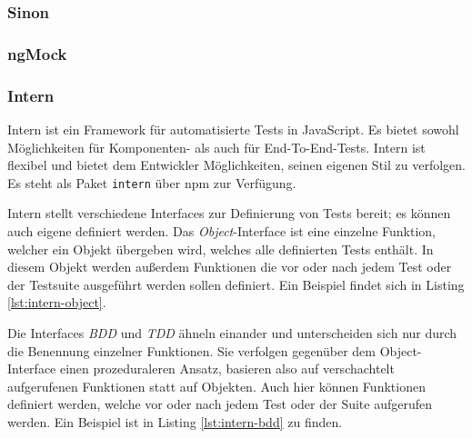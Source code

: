 \begin{figure}[H]
	
\end{figure}


\subsubsection{Sinon}
\label{sec:Sinon}

\subsubsection{ngMock}
\label{sec:ngMock}

\subsubsection{Intern}
\label{sec:Intern}
Intern ist ein Framework für automatisierte Tests in JavaScript. Es bietet sowohl Möglichkeiten für Komponenten- als auch für End-To-End-Tests. Intern ist flexibel und bietet dem Entwickler Möglichkeiten, seinen eigenen Stil zu verfolgen. Es steht als Paket \texttt{intern} über npm zur Verfügung.\cite{intern-userguide}

Intern stellt verschiedene Interfaces zur Definierung von Tests bereit; es können auch eigene definiert werden. Das \textit{Object}-Interface ist eine einzelne Funktion, welcher ein Objekt übergeben wird, welches alle definierten Tests enthält. In diesem Objekt werden außerdem Funktionen die vor oder nach jedem Test oder der Testsuite ausgeführt werden sollen definiert. Ein Beispiel findet sich in Listing \ref{lst:intern-object}.\cite{intern-userguide}

\begin{figure}[H]
	
\end{figure}

Die Interfaces \textit{BDD} und \textit{TDD} ähneln einander und unterscheiden sich nur durch die Benennung einzelner Funktionen. Sie verfolgen gegenüber dem Object-Interface einen prozeduraleren Ansatz, basieren also auf verschachtelt aufgerufenen Funktionen statt auf Objekten. Auch hier können Funktionen definiert werden, welche vor oder nach jedem Test oder der Suite aufgerufen werden. Ein Beispiel ist in Listing \ref{lst:intern-bdd} zu finden.\cite{intern-userguide}

